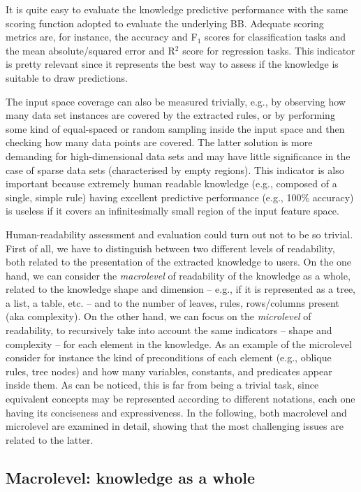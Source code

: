 \documentclass[sigconf]{acmart}
\begin{document}
It is quite easy to evaluate the knowledge predictive performance with the same scoring function adopted to evaluate the underlying BB.
%
Adequate scoring metrics are, for instance, the accuracy and F$_1$ scores for classification tasks and the mean absolute/squared error and R$^2$ score for regression tasks.
%
This indicator is pretty relevant since it represents the best way to assess if the knowledge is suitable to draw predictions.

The input space coverage can also be measured trivially, e.g., by observing how many data set instances are covered by the extracted rules, or by performing some kind of equal-spaced or random sampling inside the input space and then checking how many data points are covered.
%
The latter solution is more demanding for high-dimensional data sets and may have little significance in the case of sparse data sets (characterised by empty regions).
%
This indicator is also important because extremely human readable knowledge (e.g., composed of a single, simple rule) having excellent predictive performance (e.g., 100\% accuracy) is useless if it covers an infinitesimally small region of the input feature space.

Human-readability assessment and evaluation could turn out not to be so trivial.
%
First of all, we have to distinguish between two different levels of readability, both related to the presentation of the extracted knowledge to users.
%
On the one hand, we can consider the \emph{macrolevel} of readability of the knowledge as a whole, related to the knowledge shape and dimension -- e.g., if it is represented as a tree, a list, a table, etc. -- and to the number of leaves, rules, rows/columns present (aka complexity).
%
On the other hand, we can focus on the \emph{microlevel} of readability, to recursively take into account the same indicators -- shape and complexity -- for each element in the knowledge.
%
As an example of the microlevel consider for instance the kind of preconditions of each element (e.g., oblique rules, \mofn{} tree nodes) and how many variables, constants, and predicates appear inside them.
%
As can be noticed, this is far from being a trivial task, since equivalent concepts may be represented according to different notations, each one having its conciseness and expressiveness.
%
In the following, both macrolevel and microlevel are examined in detail, showing that the most challenging issues are related to the latter.

\subsection{Macrolevel: knowledge as a whole}\label{ssec:macro}
\end{document}
